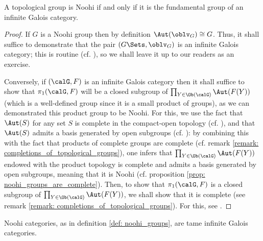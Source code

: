             \begin{lemma} \label{lemma: fundamental_groups_of_infinite_galois_categories_are_noohi}
                A topological group is Noohi if and only if it is the fundamental group of an infinite Galois category.
            \end{lemma}
                \begin{proof}
                    If $G$ is a Noohi group then by definition $\Aut(\oblv_G) \cong G$. Thus, it shall suffice to demonstrate that the pair $(G\-\Sets, \oblv_G)$ is an infinite Galois category; this is routine (cf. \cite[Section 3]{nlab:category_of_G_sets}), so we shall leave it up to our readers as an exercise.
                
                    Conversely, if $(\calG, F)$ is an infinite Galois category then it shall suffice to show that $\pi_1(\calG, F)$ will be a closed subgroup of $\prod_{Y \in \Ob(\calG)} \Aut(F(Y))$ (which is a well-defined group since it is a small product of groups), as we can demonstrated this product group to be Noohi. For this, we use the fact that $\Aut(S)$ for any set $S$ is complete in the compact-open topology (cf. \cite[Lemma 7.1.4]{bhatt_scholze_2014_pro_etale}), and that $\Aut(S)$ admits a basis generated by open subgroups (cf. \cite[\href{https://stacks.math.columbia.edu/tag/0BMC}{Tag 0BMC}]{stacks}): by combining this with the fact that products of complete groups are complete (cf. remark \ref{remark: completions_of_topological_groups}), one infers that $\prod_{Y \in \Ob(\calG)} \Aut(F(Y))$ endowed with the product topology is complete and admits a basis generated by open subgroups, meaning that it is Noohi (cf. proposition \ref{prop: noohi_groups_are_complete}). Then, to show that $\pi_1(\calG, F)$ is a closed subgroup of $\prod_{Y \in \Ob(\calG)} \Aut(F(Y))$, we shall show that it is complete (see remark \ref{remark: completions_of_topological_groups}). For this, see \cite[\href{https://stacks.math.columbia.edu/tag/0BMR}{Tag 0BMR}]{stacks}.
                \end{proof}
            \begin{corollary} \label{coro: noohi_categories_are_tame}
                Noohi categories, as in definition \ref{def: noohi_groups}, are tame infinite Galois categories. 
            \end{corollary}
                
